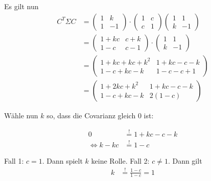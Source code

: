Es gilt nun
\begin{align}
C^T \Sigma C &= \begin{pmatrix}1&k\\1&-1\end{pmatrix} \cdot \begin{pmatrix}1&c\\c&1\end{pmatrix}\begin{pmatrix}1&1\\k&-1\end{pmatrix}\\
&= \begin{pmatrix}1+kc&c+k\\1-c&c-1\end{pmatrix} \cdot \begin{pmatrix}1&1\\k&-1\end{pmatrix}\\
&= \begin{pmatrix}1+kc+kc+k^2&1+kc-c-k\\1-c+kc-k&1-c-c+1\end{pmatrix}\\
&= \begin{pmatrix}1+2kc+k^2&1+kc-c-k\\1-c+kc-k&2(1-c)\end{pmatrix}
\end{align}

Wähle nun $k$ so, dass die Covarianz gleich 0 ist:

\begin{align}
 0&\stackrel{!}{=} 1+kc-c-k\\
 \Leftrightarrow k - kc &\stackrel{!}{=} 1-c
\end{align}

Fall 1: $c = 1$. Dann spielt $k$ keine Rolle.
Fall 2: $c \neq 1$. Dann gilt
\begin{align}
 k &\stackrel{!}{=} \frac{1-c}{1-c} = 1
\end{align}